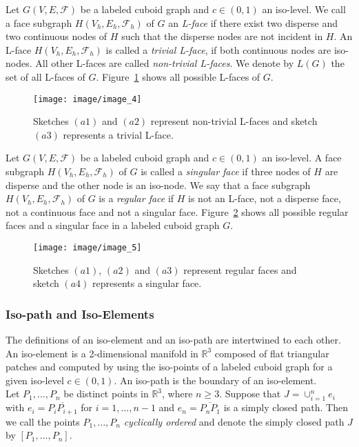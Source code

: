 \documentclass[a4paper,11pt]{article}
\begin{document}
Let $G(V,E,\mathcal{F})$ be a labeled cuboid graph and
$c\in (0,1)$ an iso-level. We call a face subgraph $H(V_h,E_h,\mathcal{F}_h)$ of $G$
an {\it L-face} if there exist two disperse and two continuous nodes of $H$ such that
the disperse nodes are not incident in $H$. An L-face $H(V_h,E_h,\mathcal{F}_h)$
is called a {\it trivial L-face}, if both continuous nodes are iso-nodes. All other L-faces are called
{\it non-trivial L-faces}. We denote by $L(G)$ the set of all L-faces of $G$. Figure~\ref{image_4} shows
all possible L-faces of $G$.
\begin{figure}[!ht]
\texttt{[image: image/image\_4]}
\caption{Sketches $(a1)$ and $(a2)$ represent non-trivial L-faces and sketch $(a3)$ represents a trivial L-face.}
\label{image_4}
\end{figure}
\FloatBarrier

Let $G(V,E,\mathcal{F})$ be a labeled cuboid graph and
$c\in (0,1)$ an iso-level. A face subgraph $H(V_h,E_h,\mathcal{F}_h)$ of
$G$ is called a {\it singular face} if three nodes of $H$ are disperse and the other node is
an iso-node. We say that a face subgraph $H(V_h,E_h,\mathcal{F}_h)$ of $G$ is a
{\it regular face} if  $H$ is not an L-face, not a disperse face, not a continuous face and not a
singular face. Figure~\ref{image_5} shows all possible regular faces and a singular face in
a labeled cuboid graph $G$.
\begin{figure}[!ht]
\texttt{[image: image/image\_5]}
\caption{Sketches $(a1)$, $(a2)$ and $(a3)$ represent regular faces and sketch $(a4)$ represents a singular face.}
\label{image_5}
\end{figure}
\FloatBarrier

\subsubsection{Iso-path and Iso-Elements}
The definitions of an iso-element and an iso-path are intertwined to each other. An iso-element is
a 2-dimensional manifold in $\mathbb{R}^3$ composed of flat triangular patches and computed
by using the iso-points of a labeled cuboid graph for a given iso-level $c\in (0,1)$. An iso-path is
the boundary of an iso-element.\\

Let $P_1,\ldots,P_n$ be distinct points in $\mathbb{R}^3$, where
$n\geq 3$. Suppose that $J=\cup_{i=1}^ne_i$ with $e_i=\overline{P_iP_{i+1}}$ for $i=1,\ldots,n-1$ and
$e_n=\overline{P_nP_1}$ is a simply closed path. Then we call the points
$P_1,\ldots,P_n$ {\it cyclically ordered} and denote the simply closed path $J$ by $[P_1,\ldots,P_n]$.
\end{document}
